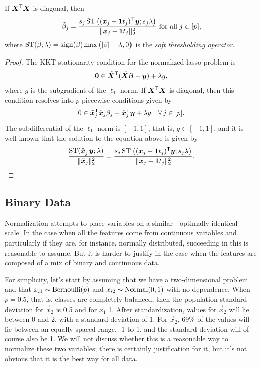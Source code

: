 \begin{proposition}
  If \(\mat X^\T \mat X\) is diagonal, then
  \[
    \hat{\beta}_j = \frac{s_j\softthreshold\big((\vec x_j - \vec{1}t_j)^\T\vec{y}; s_j\lambda\big)}{\lVert \vec x_j - \vec{1}t_j\rVert_2^2} \text{ for all } j \in [p],
  \]
  where \(\operatorname{ST}(\beta; \lambda) = \operatorname{sign}(\beta)\max\big(\lvert \beta \rvert - \lambda, 0\big)\) is the \emph{soft thresholding operator}.
\end{proposition}
\begin{proof}
  The KKT stationarity condition for the normalized lasso problem is
  \[
    \vec{0} \in \tilde{\mat{X}}^\T(\tilde{\mat{X}}\vec{\beta} - \vec{y}) + \lambda g,
  \]
  where \(g\) is the subgradient of the \(\ell_1\) norm.
  If \(\mat{X}^\T\mat{X}\) is diagonal, then this condition resolves into \(p\) piecewise conditions given by
  \[
    0 \in \tilde{\vec{x}}_j^\T\tilde{\vec{x}}_j\beta_j - \tilde{\vec{x}}_j^\T\vec{y} + \lambda g \quad \forall\, j \in [p].
  \]
  The subdifferential of the \(\ell_1\) norm is \([-1, 1]\), that is, \(g \in [-1, 1]\), and it is well-known that the solution to the equation above is
  given by
  \[
    \frac{\softthreshold(\tilde{\vec{x}}_j^\T \vec{y}; \lambda)}{\lVert \tilde{\vec{x}}_j\rVert_2^2} =
    \frac{s_j\softthreshold\big((\vec{x}_j - \vec{1}t_j)^\T\vec{y}; s_j\lambda\big)}{\lVert \vec{x}_j - \vec{1}t_j\rVert_2^2}.
  \]
\end{proof}

\subsection{Binary Data}

Normalization attempts to place variables on a similar---optimally identical---scale. In the case when all the features come from continuous variables and particularly if they are, for instance, normally distributed, succeeding in this is reasonable to assume. But it is harder to justify in the case when the features are composed of a mix of binary and continuous data.

For simplicity, let's start by assuming that we have a two-dimensional problem and that \(x_{i1} \sim \operatorname{Bernoulli}(p)\) and \(x_{i2} \sim \operatorname{Normal}(0, 1)\) with no dependence. When \(p = 0.5\), that is, classes are completely balanced, then the population standard deviation for \(\vec{x}_2\) is 0.5 and for \(x_1\) 1. After standardization, values for \(\vec{x}_2\) will lie between 0 and 2, with a standard deviation of 1. For \(\vec{x}_2\), 69\% of the values will lie between an equally spaced range, -1 to 1, and the standard deviation will of course also be 1. We will not discuss whether this is a reasonable way to normalize these two variables; there is certainly justification for it, but it's not obvious that it is the best way for all data.


